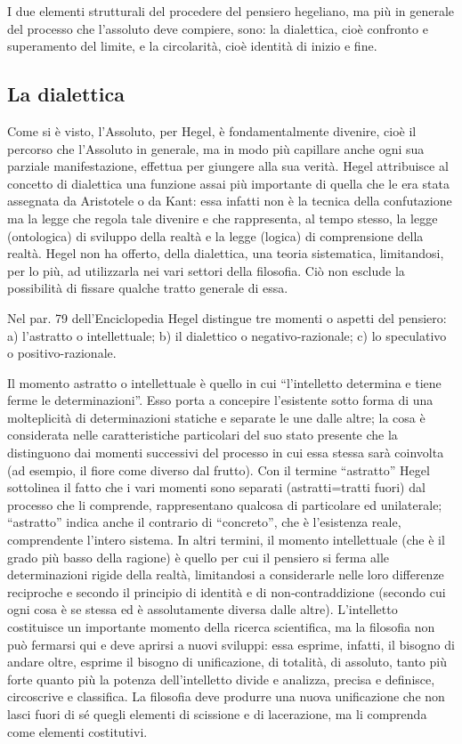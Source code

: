 \documentclass[a4paper,12pt,oneside,openany]{book}%
\begin{document}
I due elementi strutturali del procedere del pensiero hegeliano, ma più in generale del processo che l’assoluto deve compiere, sono: la dialettica, cioè confronto e superamento del limite, e la circolarità, cioè identità di inizio e fine.

\subsection*{La dialettica}

Come si è visto, l’Assoluto, per Hegel, è fondamentalmente divenire, cioè il percorso che l’Assoluto in generale, ma in modo più capillare anche ogni sua parziale manifestazione, effettua per giungere alla sua verità. Hegel attribuisce al concetto di dialettica una funzione assai più importante di quella che le era stata assegnata da Aristotele o da Kant: essa infatti non è la tecnica della confutazione ma la legge che regola tale divenire e che rappresenta, al tempo stesso, la legge (ontolo­gica) di sviluppo della realtà e la legge (logica) di comprensione della realtà. Hegel non ha offerto, della dialettica, una teoria sistematica, limitandosi, per lo più, ad utilizzarla nei vari settori della filosofia. Ciò non esclude la possibilità di fissare qualche tratto generale di essa.

Nel par. 79 dell’Enciclopedia Hegel distingue tre momenti o aspetti del pensiero: a) l’astratto o intellettuale; b) il dialettico o negativo‑razionale; c) lo speculativo o positivo­-razionale.

Il momento astratto o intellettuale è quello in cui “l’intelletto determina e tiene ferme le determinazioni”. Esso porta a concepire l’esistente sotto forma di una molteplicità di determinazioni statiche e separate le une dalle altre; la cosa è considerata nelle caratteristiche particolari del suo stato presente che la distinguono dai momenti successivi del processo in cui essa stessa sarà coinvolta (ad esempio, il fiore come diverso dal frutto). Con il termine “astratto” Hegel sottolinea il fatto che i vari momenti sono separati (astratti=tratti fuori) dal processo che li comprende, rappresentano qualcosa di particolare ed unilaterale; “astratto” indica anche il contrario di “concreto”, che è l’esistenza reale, comprendente l’intero sistema. In altri termini, il momento intellettuale (che è il grado più basso della ragione) è quello per cui il pensiero si ferma alle determinazioni rigide della realtà, limitandosi a considerar­le nelle loro differenze reciproche e secondo il principio di identità e di non‑contraddizio­ne (secondo cui ogni cosa è se stessa ed è assolutamente diversa dalle altre). L’intelletto costituisce un importante momento della ricerca scientifica, ma la filosofia non può fermarsi qui e deve aprirsi a nuovi sviluppi: essa esprime, infatti, il bisogno di andare oltre, esprime il bisogno di unificazione, di totalità, di assoluto, tanto più forte quanto più la potenza dell’intelletto divide e analizza, precisa e definisce, circoscrive e classifica. La filosofia deve produrre una nuova unificazione che non lasci fuori di sé quegli elementi di scissione e di lacerazione, ma li comprenda come elementi costitutivi.
\end{document}
